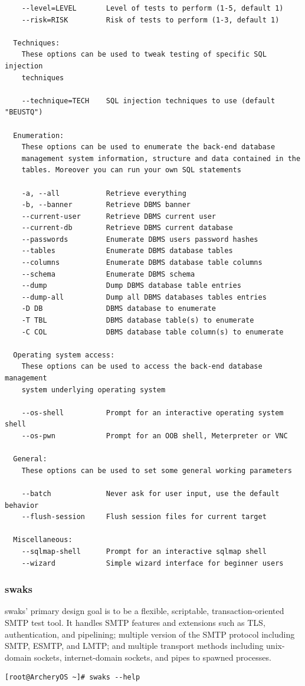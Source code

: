 \documentclass{article}
\begin{document}
\begin{lstlisting}
    --level=LEVEL       Level of tests to perform (1-5, default 1)
    --risk=RISK         Risk of tests to perform (1-3, default 1)

  Techniques:
    These options can be used to tweak testing of specific SQL injection
    techniques

    --technique=TECH    SQL injection techniques to use (default "BEUSTQ")

  Enumeration:
    These options can be used to enumerate the back-end database
    management system information, structure and data contained in the
    tables. Moreover you can run your own SQL statements

    -a, --all           Retrieve everything
    -b, --banner        Retrieve DBMS banner
    --current-user      Retrieve DBMS current user
    --current-db        Retrieve DBMS current database
    --passwords         Enumerate DBMS users password hashes
    --tables            Enumerate DBMS database tables
    --columns           Enumerate DBMS database table columns
    --schema            Enumerate DBMS schema
    --dump              Dump DBMS database table entries
    --dump-all          Dump all DBMS databases tables entries
    -D DB               DBMS database to enumerate
    -T TBL              DBMS database table(s) to enumerate
    -C COL              DBMS database table column(s) to enumerate

  Operating system access:
    These options can be used to access the back-end database management
    system underlying operating system

    --os-shell          Prompt for an interactive operating system shell
    --os-pwn            Prompt for an OOB shell, Meterpreter or VNC

  General:
    These options can be used to set some general working parameters

    --batch             Never ask for user input, use the default behavior
    --flush-session     Flush session files for current target

  Miscellaneous:
    --sqlmap-shell      Prompt for an interactive sqlmap shell
    --wizard            Simple wizard interface for beginner users
\end{lstlisting}

\subsubsection{swaks}
swaks' primary design goal is to be a flexible, scriptable, transaction-oriented SMTP test tool.  It handles SMTP features and extensions such as TLS, authentication, and pipelining; multiple version of the SMTP protocol including SMTP, ESMTP, and LMTP; and multiple transport methods including unix-domain sockets, internet-domain sockets, and pipes to spawned processes.
\begin{lstlisting}
[root@ArcheryOS ~]# swaks --help
\end{lstlisting}
\end{document}
